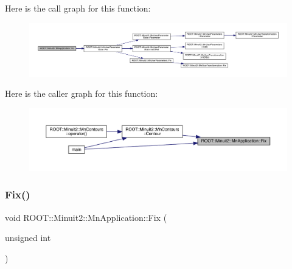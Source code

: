 Here is the call graph for this function\+:\nopagebreak
\begin{figure}[H]
\begin{center}
\leavevmode
\includegraphics[width=350pt]{df/dd5/classROOT_1_1Minuit2_1_1MnApplication_a98bea1ca3fb2a311b1c0e72a58ec2d9f_cgraph}
\end{center}
\end{figure}
Here is the caller graph for this function\+:\nopagebreak
\begin{figure}[H]
\begin{center}
\leavevmode
\includegraphics[width=350pt]{df/dd5/classROOT_1_1Minuit2_1_1MnApplication_a98bea1ca3fb2a311b1c0e72a58ec2d9f_icgraph}
\end{center}
\end{figure}
\mbox{\label{classROOT_1_1Minuit2_1_1MnApplication_a98bea1ca3fb2a311b1c0e72a58ec2d9f}} 
\subsubsection{\texorpdfstring{Fix()}{Fix()}\hspace{0.1cm}{\footnotesize\ttfamily [2/4]}}
{\footnotesize\ttfamily void R\+O\+O\+T\+::\+Minuit2\+::\+Mn\+Application\+::\+Fix (\begin{DoxyParamCaption}\item[{unsigned int}]{ }\end{DoxyParamCaption})}

\mbox{\label{classROOT_1_1Minuit2_1_1MnApplication_aa678010fc292b1d0f4cb1761b13104c4}} 
